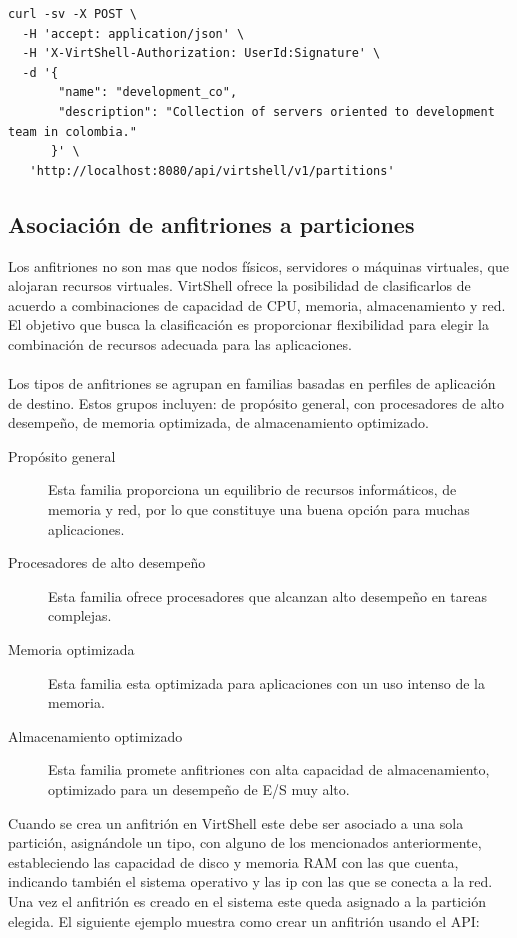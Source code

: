 \begin{lstlisting}[style=json, caption=Petición HTTP para crear una partición]
curl -sv -X POST \
  -H 'accept: application/json' \
  -H 'X-VirtShell-Authorization: UserId:Signature' \
  -d '{
  	   "name": "development_co",
       "description": "Collection of servers oriented to development team in colombia."
      }' \
   'http://localhost:8080/api/virtshell/v1/partitions'
\end{lstlisting}


\subsection{Asociación de anfitriones a particiones}
Los anfitriones no son mas que nodos físicos, servidores o máquinas virtuales, que alojaran recursos virtuales. VirtShell ofrece la posibilidad de clasificarlos de acuerdo a combinaciones de capacidad de CPU, memoria, almacenamiento y red. El objetivo que busca la clasificación es proporcionar flexibilidad para elegir la combinación de recursos adecuada para las aplicaciones.\\
\\
Los tipos de anfitriones se agrupan en familias basadas en perfiles de aplicación de destino. Estos grupos incluyen: de propósito general, con procesadores de alto desempeño, de memoria optimizada, de almacenamiento optimizado.

\begin{description}
\item [Propósito general] Esta familia proporciona un equilibrio de recursos informáticos, de memoria y red, por lo que constituye una buena opción para muchas aplicaciones.
\item [Procesadores de alto desempeño] Esta familia ofrece procesadores que alcanzan alto desempeño en tareas complejas.
\item [Memoria optimizada] Esta familia esta optimizada para aplicaciones con un uso intenso de la memoria.
\item [Almacenamiento optimizado] Esta familia promete anfitriones con alta capacidad de almacenamiento, optimizado para un desempeño de E/S muy alto.
\end{description}

Cuando se crea un anfitrión en VirtShell este debe ser asociado a una sola partición, asignándole un tipo, con alguno de los mencionados anteriormente, estableciendo las capacidad de disco y memoria RAM con las que cuenta,  
indicando también el sistema operativo y las ip con las que se conecta a la red. Una vez el anfitrión es creado en el sistema este queda asignado a la partición elegida. El siguiente ejemplo muestra como crear un anfitrión usando el API:

